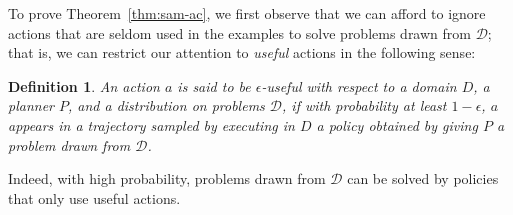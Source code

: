 \documentclass[letterpaper]{article} %
\newtheorem{definition}{Definition}
\begin{document}

To prove Theorem~\ref{thm:sam-ac}, we first observe that we can afford to ignore actions that are seldom used in the examples to solve problems drawn from $\mathcal{D}$; that is, we can restrict our attention to \emph{useful} actions in the following sense:

\begin{definition}\label{def:useful}
An action $a$ is said to be \emph{$\epsilon$-useful} with respect to a domain $D$, a planner $P$, and a distribution on problems $\mathcal{D}$, if with probability at least $1-\epsilon$, $a$ appears in a trajectory sampled by executing in $D$ a policy obtained by giving $P$ a problem drawn from $\mathcal{D}$. \end{definition}
\noindent
Indeed, with high probability, problems drawn from $\mathcal{D}$ can be solved by policies that only use useful actions.
\end{document}
